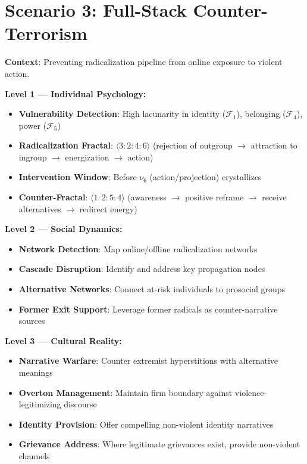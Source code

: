\documentclass[11pt,twoside]{book}
\newcommand{\noe}[1]{\nu_{#1}}
\newcommand{\Foundations}{\mathcal{F}}
\begin{document}
\section{Scenario 3: Full-Stack Counter-Terrorism}

\textbf{Context}: Preventing radicalization pipeline from online exposure to violent action.

\begin{tcolorbox}[colback=green!5!white,colframe=green!65!black,title=\textbf{Counter-Terrorism Stack Deployment},breakable]

\textbf{Level 1 --- Individual Psychology:}
\begin{itemize}
    \item \textbf{Vulnerability Detection}: High lacunarity in identity ($\Foundations_1$),
          belonging ($\Foundations_4$), power ($\Foundations_5$)
    \item \textbf{Radicalization Fractal}: $\langle 3:2:4:6 \rangle$
          (rejection of outgroup $\to$ attraction to ingroup $\to$ energization $\to$ action)
    \item \textbf{Intervention Window}: Before $\noe{6}$ (action/projection) crystallizes
    \item \textbf{Counter-Fractal}: $\langle 1:2:5:4 \rangle$
          (awareness $\to$ positive reframe $\to$ receive alternatives $\to$ redirect energy)
\end{itemize}

\textbf{Level 2 --- Social Dynamics:}
\begin{itemize}
    \item \textbf{Network Detection}: Map online/offline radicalization networks
    \item \textbf{Cascade Disruption}: Identify and address key propagation nodes
    \item \textbf{Alternative Networks}: Connect at-risk individuals to prosocial groups
    \item \textbf{Former Exit Support}: Leverage former radicals as counter-narrative sources
\end{itemize}

\textbf{Level 3 --- Cultural Reality:}
\begin{itemize}
    \item \textbf{Narrative Warfare}: Counter extremist hyperstitions with alternative meanings
    \item \textbf{Overton Management}: Maintain firm boundary against violence-legitimizing discourse
    \item \textbf{Identity Provision}: Offer compelling non-violent identity narratives
    \item \textbf{Grievance Address}: Where legitimate grievances exist, provide non-violent channels
\end{itemize}


\end{tcolorbox}
\end{document}

